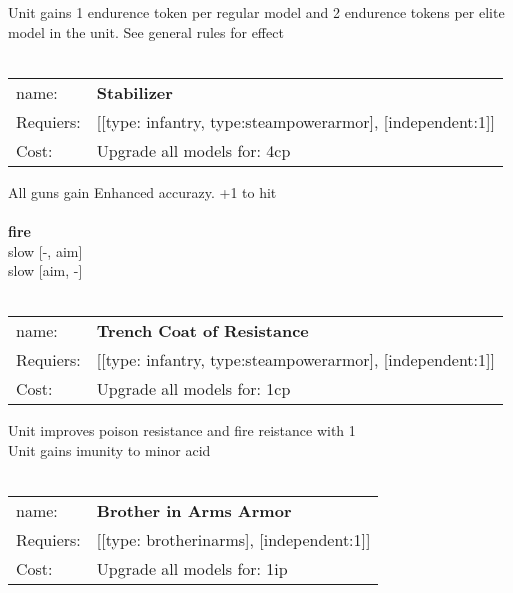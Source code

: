 Unit gains 1 endurence token per regular model  and 2 endurence tokens per elite model in the unit. See general rules for effect\\ 









\ \\
\begin{tabular}{ll}
name: & {\bf Stabilizer } \\
Requiers: & [[type: infantry, type:steampowerarmor], [independent:1]] \\
Cost: & Upgrade all models for: 4cp \\
\end{tabular}

All guns gain Enhanced accurazy. +1 to hit\\ 








\ \\ {\bf fire } \\
slow [-, aim] \\
slow [aim, -] \\

\ \\
\begin{tabular}{ll}
name: & {\bf Trench Coat of Resistance } \\
Requiers: & [[type: infantry, type:steampowerarmor], [independent:1]] \\
Cost: & Upgrade all models for: 1cp \\
\end{tabular}

Unit improves poison resistance and fire reistance with 1\\ 
Unit gains imunity to minor acid\\ 









\ \\
\begin{tabular}{ll}
name: & {\bf Brother in Arms Armor } \\
Requiers: & [[type: brotherinarms], [independent:1]] \\
Cost: & Upgrade all models for: 1ip \\
\end{tabular}

